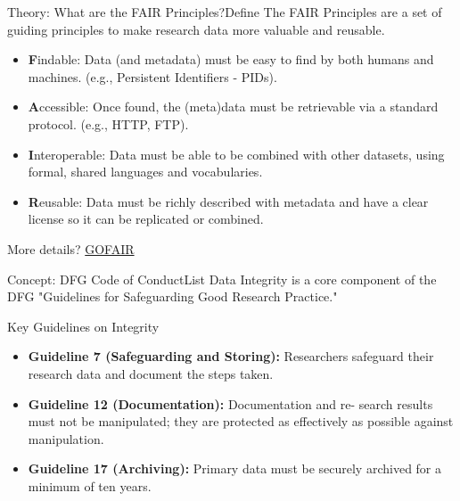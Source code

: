 \begin{frame}{Theory: What are the FAIR Principles?}{Define}
    The FAIR Principles are a set of guiding principles to make research data more valuable and reusable.
    
    \begin{itemize}
        \item \textbf{F}indable: Data (and metadata) must be easy to find by both humans and machines. (e.g., Persistent Identifiers - PIDs).
        \pause
        \item \textbf{A}ccessible: Once found, the (meta)data must be retrievable via a standard protocol. (e.g., HTTP, FTP).
        \pause
        \item \textbf{I}nteroperable: Data must be able to be combined with other datasets, using formal, shared languages and vocabularies.
        \pause
        \item \textbf{R}eusable: Data must be richly described with metadata and have a clear license so it can be replicated or combined.
    \end{itemize}
    More details? \href{https://www.go-fair.org/wp-content/uploads/2022/01/FAIRPrinciples_overview.pdf}{GOFAIR}
\end{frame}

\begin{frame}{Concept: DFG Code of Conduct}{List}
    Data Integrity is a core component of the DFG "Guidelines for Safeguarding Good Research Practice." 
    \cite{deutsche_forschungsgemeinschaft_2025_14281892}
    
    
    \begin{block}{Key Guidelines on Integrity}
        \begin{itemize}
            \item \textbf{Guideline 7 (Safeguarding and Storing):} Researchers safeguard their research data and document the steps taken.
            \pause
            \item \textbf{Guideline 12 (Documentation):} Documentation and re- search results must not be manipulated; they are protected as effectively as possible against manipulation.
            \pause
            \item \textbf{Guideline 17 (Archiving):} Primary data must be securely archived for a minimum of ten years.
        \end{itemize}
    \end{block}
\end{frame}

